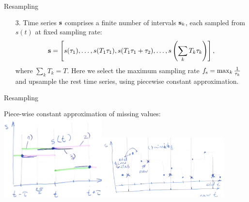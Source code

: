 \documentclass{beamer}
\begin{document}
\begin{frame}{Resampling}

\begin{enumerate}
\item[3.] Time series ${\mathbf{s}}$ comprises a finite number of intervals ${\mathbf{s}}_k$, each sampled from $s(t)$ at fixed sampling rate:
\[ {\mathbf{s}} = \left[s(\tau_1), \dots, s(T_1\tau_1), s(T_1\tau_1 + \tau_2), \dots,  s\left(\sum_{k}T_k\tau_k\right)\right], \] where $\sum_k{T_k} = T.$
Here we select the maximum sampling rate $f_{\text{s}} = \max_{k} \frac{1}{\tau_k}$ and upsample the rest time series, using piecewise constant approximation.
\end{enumerate}




\end{frame}
\begin{frame}{Resampling}

Piece-wise constant approximation of missing values:
\includegraphics[width=0.4\textwidth]{resample1.png}\includegraphics[width=0.5\textwidth]{resample2.png}


\end{frame}
\end{document}
